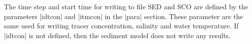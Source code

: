 The time step and start time for writing to file SED and SCO
are defined by the parameters |idtcon| and |itmcon| in the |para|
section. These parameter are the same used for writing tracer
concentration, salinity and water temperature. If |idtcon| is not
defined, then the sediment model does not write any results.


